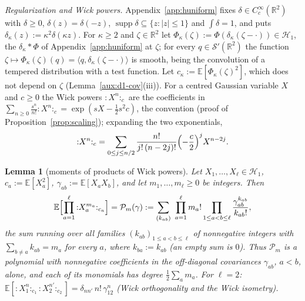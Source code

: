 \documentclass[11pt,a4paper]{article}
\theoremstyle{plain}
\theoremstyle{definition}
\theoremstyle{plain}
\newtheorem{auxlemma}{Lemma}
\theoremstyle{definition}
\newcommand{\R}{\mathbb{R}}
\newcommand{\E}{\mathbb{E}}
\DeclareMathOperator{\supp}{supp}
\begin{document}
\emph{Regularization and Wick powers.} Appendix~\ref{app:huniform} fixes
$\delta\in C_c^\infty(\R^2)$ with $\delta\ge0$, $\delta(z)=\delta(-z)$,
$\supp\delta\subseteq\{z:|z|\le1\}$ and $\int\delta=1$, and puts
$\delta_\kappa(z):=\kappa^2\delta(\kappa z)$. For $\kappa\ge2$ and $\zeta\in\R^2$ let
$\Phi_\kappa(\zeta):=\Phi(\delta_\kappa(\zeta-\cdot))\in\mathscr H_1$, the
$\delta_\kappa*\Phi$ of Appendix~\ref{app:huniform} at $\zeta$; for every $q\in\mathcal S'(\R^2)$ the function
$\zeta\mapsto\Phi_\kappa(\zeta)(q)=\langle q,\delta_\kappa(\zeta-\cdot)\rangle$ is smooth, being
the convolution of a tempered distribution with a test function. Let
$c_\kappa:=\E[\Phi_\kappa(\zeta)^2]$, which does not depend on $\zeta$
(Lemma~\ref{aux:d1-cov}(iii)). For a centred Gaussian variable $X$ and $c\ge0$ the Wick powers
${:}X^n{:}_c$ are the coefficients in
$\sum_{n\ge0}\frac{s^n}{n!}{:}X^n{:}_c=\exp(sX-\frac12s^2c)$, the convention
(proof of Proposition~\ref{prop:scaling}); expanding the two exponentials,
\begin{equation}\label{eq:d1-hermite}
 {:}X^n{:}_c=\sum_{0\le j\le n/2}\frac{n!}{j!\,(n-2j)!}\Bigl(-\frac c2\Bigr)^jX^{n-2j} .
\end{equation}

\begin{auxlemma}[moments of products of Wick powers]\label{aux:d1-wick}
Let $X_1,\dots,X_\ell\in\mathscr H_1$, $c_a:=\E[X_a^2]$, $\gamma_{ab}:=\E[X_aX_b]$, and let
$m_1,\dots,m_\ell\ge0$ be integers. Then
\begin{equation}\label{eq:d1-wick}
 \E\Bigl[\prod_{a=1}^\ell{:}X_a^{m_a}{:}_{c_a}\Bigr]=\mathcal P_m(\gamma)
 :=\sum_{(k_{ab})}\ \prod_{a=1}^\ell m_a!\prod_{1\le a<b\le\ell}
 \frac{\gamma_{ab}^{k_{ab}}}{k_{ab}!} ,
\end{equation}
the sum running over all families $(k_{ab})_{1\le a<b\le\ell}$ of nonnegative integers with
$\sum_{b\ne a}k_{ab}=m_a$ for every $a$, where $k_{ba}:=k_{ab}$ (an empty sum is $0$). Thus
$\mathcal P_m$ is a polynomial with nonnegative coefficients in the off-diagonal covariances
$\gamma_{ab}$, $a<b$, alone, and each of its monomials has degree $\frac12\sum_am_a$. For
$\ell=2$: $\E[{:}X_1^n{:}_{c_1}{:}X_2^{n'}{:}_{c_2}]=\delta_{nn'}\,n!\,\gamma_{12}^n$ (Wick
orthogonality and the Wick isometry).
\end{auxlemma}
\end{document}
